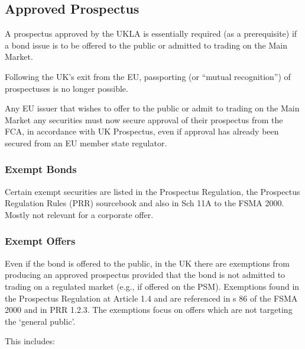\documentclass[
]{article}
\newenvironment{Shaded}{}{}
\newcommand{\NormalTok}[1]{#1}
\begin{document}
\hypertarget{approved-prospectus}{%
\subsection{Approved Prospectus}\label{approved-prospectus}}

\begin{Shaded}
\begin{Highlighting}[]
\NormalTok{A prospectus approved by the UKLA is essentially required (as a prerequisite) if a bond issue is to be offered to the public or admitted to trading on the Main Market.}
\end{Highlighting}
\end{Shaded}

Following the UK's exit from the EU, passporting (or ``mutual
recognition'') of prospectuses is no longer possible.

Any EU issuer that wishes to offer to the public or admit to trading on
the Main Market any securities must now secure approval of their
prospectus from the FCA, in accordance with UK Prospectus, even if
approval has already been secured from an EU member state regulator.

\hypertarget{exempt-bonds}{%
\subsubsection{Exempt Bonds}\label{exempt-bonds}}

Certain exempt securities are listed in the Prospectus Regulation, the
Prospectus Regulation Rules (PRR) sourcebook and also in Sch 11A to the
FSMA 2000. Mostly not relevant for a corporate offer.

\hypertarget{exempt-offers}{%
\subsubsection{Exempt Offers}\label{exempt-offers}}

Even if the bond is offered to the public, in the UK there are
exemptions from producing an approved prospectus provided that the bond
is not admitted to trading on a regulated market (e.g., if offered on
the PSM). Exemptions found in the Prospectus Regulation at Article 1.4
and are referenced in s 86 of the FSMA 2000 and in PRR 1.2.3. The
exemptions focus on offers which are not targeting the `general public'.

This includes:
\end{document}
